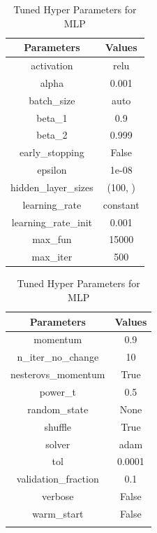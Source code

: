 \documentclass[conference]{IEEEtran}
\begin{document}
\begin{table}[!ht]
    \caption{Tuned Hyper Parameters for MLP}
    \label{param:mlp}
    \centering
    \setlength{\tabcolsep}{1pt}
    \begin{tabular}{c c}
        \hline 
        \bfseries Parameters & \bfseries Values\\
        \hline  \hline
        activation & relu \\
        alpha & 0.001 \\
        batch\_size & auto \\
        beta\_1 & 0.9 \\
        beta\_2 & 0.999 \\
        early\_stopping & False \\
        epsilon & 1e-08 \\
        hidden\_layer\_sizes & (100, ) \\
        learning\_rate & constant \\
        learning\_rate\_init & 0.001 \\
        max\_fun & 15000 \\
        max\_iter & 500 \\
        \hline
    \end{tabular}
    \quad
    \setlength{\tabcolsep}{1pt}
    \begin{tabular}{c c}
        \hline 
        \bfseries Parameters & \bfseries Values\\
        \hline  \hline
        momentum & 0.9 \\
        n\_iter\_no\_change & 10 \\
        nesterovs\_momentum & True \\
        power\_t & 0.5 \\
        random\_state & None \\
        shuffle & True \\
        solver & adam \\
        tol & 0.0001 \\
        validation\_fraction & 0.1 \\
        verbose & False \\
        warm\_start & False\\
        \\
        \hline
    \end{tabular}
\end{table}
\end{document}
